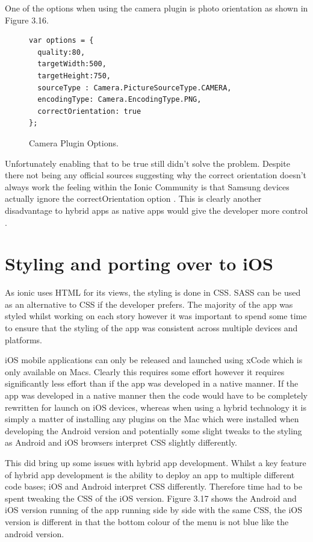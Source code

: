 One of the options when using the camera plugin is photo orientation as shown in Figure 3.16. 
\begin{center}
\begin{figure}[H]
\begin{verbatim}
var options = {
  quality:80,
  targetWidth:500,
  targetHeight:750,
  sourceType : Camera.PictureSourceType.CAMERA,
  encodingType: Camera.EncodingType.PNG,
  correctOrientation: true
};
\end{verbatim}
\caption{Camera Plugin Options.}
\end{figure}
\end{center}
Unfortunately enabling that to be true still didn't solve the problem. Despite there not being any official sources suggesting why the correct orientation doesn't always work the feeling within the Ionic Community is that Samsung devices actually ignore the correctOrientation option \cite{ioniccom1}. This is clearly another disadvantage to hybrid apps as native apps would give the developer more control \cite{androidcamera}.
\section{Styling and porting over to iOS}
As ionic uses HTML for its views, the styling is done in CSS. SASS can be used as an alternative to CSS if the developer prefers. The majority of the app was styled whilst working on each story however it was important to spend some time to ensure that the styling of the app was consistent across multiple devices and platforms.

iOS mobile applications can only be released and launched using xCode which is only available on Macs. Clearly this requires some effort however it requires significantly less effort than if the app was developed in a native manner. If the app was developed in a native manner then the code would have to be completely rewritten for launch on iOS devices, whereas when using a hybrid technology it is simply a matter of installing any plugins on the Mac which were installed when developing the Android version and potentially some slight tweaks to the styling as Android and iOS browsers interpret CSS slightly differently. 

This did bring up some issues with hybrid app development. Whilst a key feature of hybrid app development is the ability to deploy an app to multiple different code bases; iOS and Android interpret CSS differently. Therefore time had to be spent tweaking the CSS of the iOS version. Figure 3.17 shows the Android and iOS version running of the app running side by side with the same CSS, the iOS version is different in that the bottom colour of the menu is not blue like the android version.

